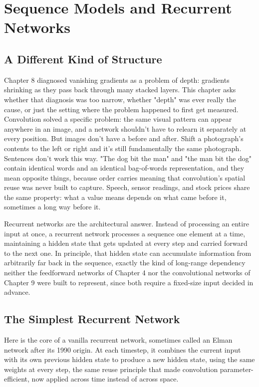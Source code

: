\chapter{Sequence Models and Recurrent Networks}

\section*{A Different Kind of Structure}

Chapter 8 diagnosed vanishing gradients as a problem of depth: gradients shrinking as they pass back through many stacked layers. This chapter asks whether that diagnosis was too narrow, whether "depth" was ever really the cause, or just the setting where the problem happened to first get measured. Convolution solved a specific problem: the same visual pattern can appear anywhere in an image, and a network shouldn't have to relearn it separately at every position. But images don't have a before and after. Shift a photograph's contents to the left or right and it's still fundamentally the same photograph. Sentences don't work this way. "The dog bit the man" and "the man bit the dog" contain identical words and an identical bag-of-words representation, and they mean opposite things, because order carries meaning that convolution's spatial reuse was never built to capture. Speech, sensor readings, and stock prices share the same property: what a value means depends on what came before it, sometimes a long way before it.

Recurrent networks are the architectural answer. Instead of processing an entire input at once, a recurrent network processes a sequence one element at a time, maintaining a hidden state that gets updated at every step and carried forward to the next one. In principle, that hidden state can accumulate information from arbitrarily far back in the sequence, exactly the kind of long-range dependency neither the feedforward networks of Chapter 4 nor the convolutional networks of Chapter 9 were built to represent, since both require a fixed-size input decided in advance.

\section*{The Simplest Recurrent Network}

Here is the core of a vanilla recurrent network, sometimes called an Elman network after its 1990 origin. At each timestep, it combines the current input with its own previous hidden state to produce a new hidden state, using the same weights at every step, the same reuse principle that made convolution parameter-efficient, now applied across time instead of across space.

